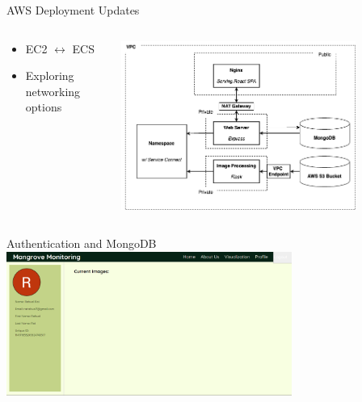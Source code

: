\begin{frame}{AWS Deployment Updates}
    \begin{columns}
        \begin{column}{0.3\textwidth}
            \begin{itemize}
                \item EC2 $\leftrightarrow$ ECS
                \item Exploring networking options
            \end{itemize}  
        \end{column}
        \begin{column}{0.7\textwidth}
            \centering
            \includegraphics[height=0.8\textheight,width=0.8\textwidth,keepaspectratio]{images/mm_system_2.png}
        \end{column}
    \end{columns}
\end{frame}

\begin{frame}{Authentication and MongoDB}
    \centering
    \includegraphics[height=0.7\textheight,width=0.7\textwidth,keepaspectratio]{images/mm_profile.png}
\end{frame}


